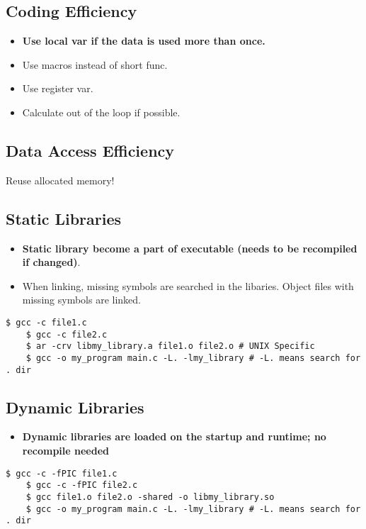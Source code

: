 \documentclass{article}
\begin{document}
\subsection{Coding Efficiency}
\begin{itemize}
    \item \textbf{Use local var if the data is used more than once.}
    \item Use macros instead of short func.
    \item Use register var.
    \item Calculate out of the loop if possible.
\end{itemize}

\subsection{Data Access Efficiency}
Reuse allocated memory!

\subsection{Static Libraries}
\begin{itemize}
    \item \textbf{Static library become a part of executable (needs to be recompiled if changed)}.
    \item When linking, missing symbols are searched in the libaries. Object files with missing symbols are linked.
\end{itemize}
\begin{lstlisting}[style=BashStyle]
    $ gcc -c file1.c
    $ gcc -c file2.c
    $ ar -crv libmy_library.a file1.o file2.o # UNIX Specific
    $ gcc -o my_program main.c -L. -lmy_library # -L. means search for . dir
\end{lstlisting}

\subsection{Dynamic Libraries}
\begin{itemize}
    \item \textbf{Dynamic libraries are loaded on the startup and runtime; no recompile needed}
\end{itemize}
\begin{lstlisting}[style=BashStyle]
    $ gcc -c -fPIC file1.c
    $ gcc -c -fPIC file2.c
    $ gcc file1.o file2.o -shared -o libmy_library.so
    $ gcc -o my_program main.c -L. -lmy_library # -L. means search for . dir
\end{lstlisting}
\end{document}
